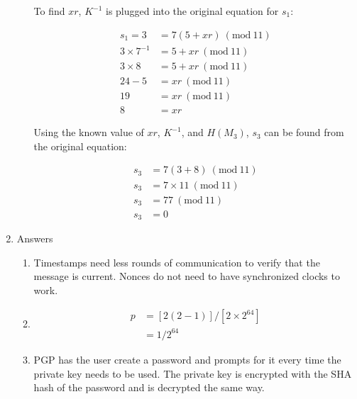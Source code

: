 \documentclass{article}
\newcommand{\Mod}[1]{\ (\mathrm{mod}\ #1)}
\begin{document}
\begin{enumerate}
\begin{enumerate}
        To find $xr$, $K^{-1}$ is plugged into the original equation for $s_1$:

        \begin{align*}
        s_1 = 3 &= 7 (5 + xr) \Mod{11}\\
        3 \times 7^{-1} &= 5 + xr \Mod{11}\\
        3 \times 8 &= 5 + xr \Mod{11}\\
        24 - 5 &= xr \Mod{11}\\
        19 &= xr \Mod{11}\\
        8 &= xr
        \end{align*}

        Using the known value of $xr$, $K^{-1}$, and $H(M_3)$, $s_3$ can be found from the original equation: 
        
        \begin{align*}
        s_3 &= 7 (3 + 8) \Mod{11}\\
        s_3 &= 7 \times 11 \Mod{11}\\
        s_3 &= 77 \Mod{11}\\
        s_3 &= 0
        \end{align*}
        
        
    \end{enumerate}

    \item Answers
    \begin{enumerate}
        \item Timestamps need less rounds of communication to verify that the message is current. Nonces do not need to have synchronized clocks to work.

        \item 
        \begin{align*}
            p &= [{2(2-1)}]/[{2 \times 2^{64}}]\\
           &= 1/2^{64}
        \end{align*}
        

        \item PGP has the user create a password and prompts for it every time the private key needs to be used. The private key is encrypted with the SHA hash of the password and is decrypted the same way.


\end{enumerate}
\end{enumerate}
\end{document}
